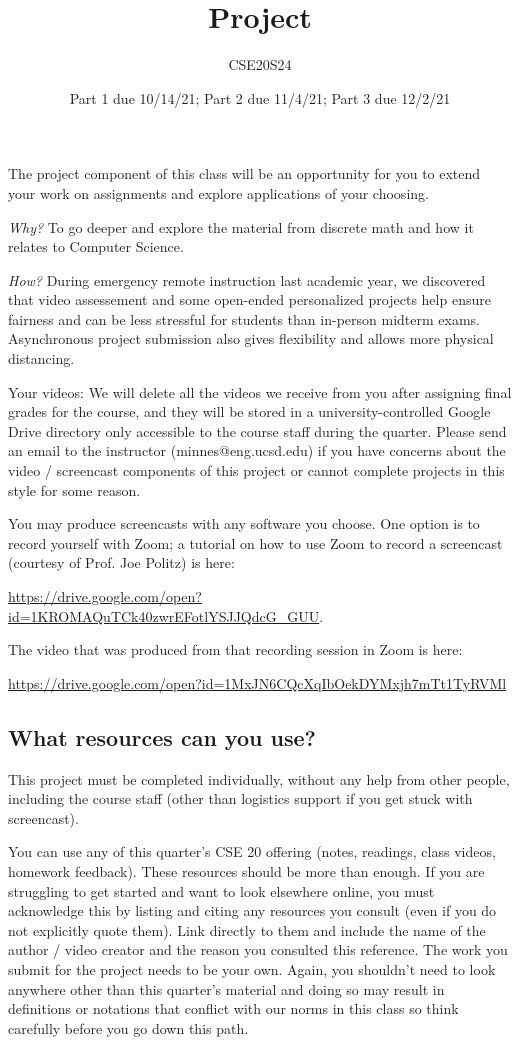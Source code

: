 \documentclass[12pt, oneside]{article}
\author{CSE20S24}
\title{Project}
\date{Part 1 due 10/14/21; Part 2 due 11/4/21; Part 3 due 12/2/21}
\begin{document}
\maketitle
\thispagestyle{fancy}
The project component of this class will be an opportunity for you to extend your 
work on assignments and explore applications of your choosing. 

{\it Why?}
To go deeper and explore the material from discrete math and how it relates to Computer Science.

{\it How?} During emergency remote instruction last academic year, we discovered
that video assessement and some open-ended personalized projects help ensure fairness
and can be less stressful for students than in-person midterm exams. Asynchronous project
submission also gives flexibility and allows more physical distancing.

Your videos: We will delete all the videos we receive from you after assigning final grades for the course, 
and they will be stored in a university-controlled Google Drive directory 
only accessible to the course staff during the quarter. 
Please send an email to the instructor (minnes@eng.ucsd.edu) if you have 
concerns about 
the video / screencast components of this project or cannot complete projects in this style for some reason.

You may produce screencasts with any software you choose. 
One option is to record yourself with Zoom; a tutorial on how to use Zoom to record a 
screencast (courtesy of Prof. Joe Politz)  is here: 

\url{https://drive.google.com/open?id=1KROMAQuTCk40zwrEFotlYSJJQdcG_GUU}.

The video that was produced from that recording session in Zoom is here:

\url{https://drive.google.com/open?id=1MxJN6CQcXqIbOekDYMxjh7mTt1TyRVMl}

\subsection*{What resources can you use?}
This project must be completed individually, without any help from other people, 
including the course staff (other than logistics support if you get stuck with screencast). 

You can use any of this quarter's CSE 20 offering (notes, readings, class videos, homework feedback). 
These resources should be more than enough. If you are struggling to get started and want to 
look elsewhere online, you must acknowledge this by listing and citing any resources you consult 
(even if you do not explicitly quote them). Link directly to them and include the name of the 
author / video creator and the reason you consulted this reference. The work you submit for 
the project needs to be your own. Again, you shouldn't need to look anywhere other 
than this quarter's material and doing so may result in definitions or notations 
that conflict with our norms in this class so think carefully before you go down this path.
\end{document}
